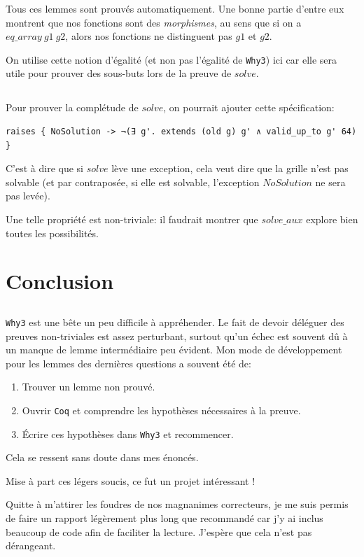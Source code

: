 ﻿\documentclass[10pt,a4paper]{article}
\begin{document}
Tous ces lemmes sont prouvés automatiquement. Une bonne partie d'entre eux montrent que nos fonctions sont des \emph{morphismes}, au sens que si on a $eq\_array\ g1\ g2$, alors nos fonctions ne distinguent pas $g1$ et $g2$.

On utilise cette notion d'égalité (et non pas l'égalité de \verb|Why3|) ici car elle sera utile pour prouver des sous-buts lors de la preuve de $solve$.

\subsection{}
Pour prouver la complétude de $solve$, on pourrait ajouter cette spécification:
\begin{verbatim}
raises { NoSolution -> ¬(∃ g'. extends (old g) g' ∧ valid_up_to g' 64) }
\end{verbatim}
C'est à dire que si $solve$ lève une exception, cela veut dire que la grille n'est pas solvable (et par contraposée, si elle est solvable, l'exception $NoSolution$ ne sera pas levée).

Une telle propriété est non-triviale: il faudrait montrer que $solve\_aux$ explore bien toutes les possibilités.

\section{Conclusion}
\subsection{}
\verb|Why3| est une bête un peu difficile à appréhender. Le fait de devoir déléguer des preuves non-triviales est assez perturbant, surtout qu'un échec est souvent dû à un manque de lemme intermédiaire peu évident. Mon mode de développement pour les lemmes des dernières questions a souvent été de:
\begin{enumerate}
\item Trouver un lemme non prouvé.
\item Ouvrir \verb|Coq| et comprendre les hypothèses nécessaires à la preuve.
\item Écrire ces hypothèses dans \verb|Why3| et recommencer.
\end{enumerate}
Cela se ressent sans doute dans mes énoncés.

\bigskip

Mise à part ces légers soucis, ce fut un projet intéressant !

\bigskip

Quitte à m'attirer les foudres de nos magnanimes correcteurs, je me suis permis de faire un rapport légèrement plus long que recommandé car j'y ai inclus beaucoup de code afin de faciliter la lecture. J'espère que cela n'est pas dérangeant.
\end{document}

